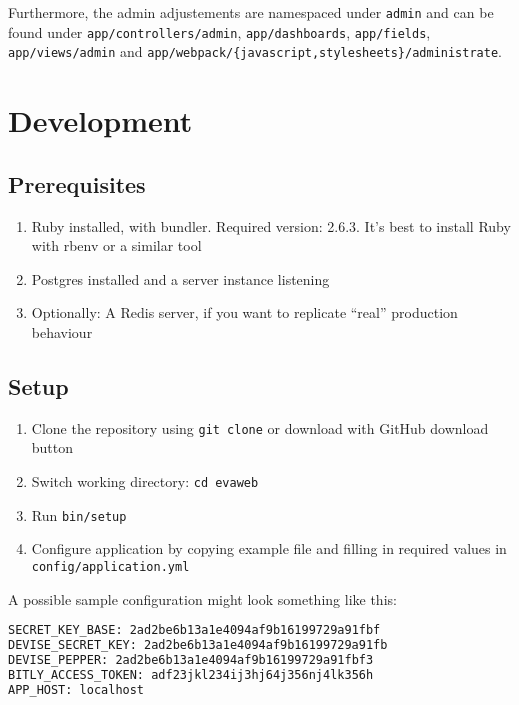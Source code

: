 \documentclass[11pt]{article}
\begin{document}
Furthermore, the admin adjustements are namespaced under \verb|admin|
and can be found under \verb|app/controllers/admin|, \verb|app/dashboards|, \verb|app/fields|, \verb|app/views/admin|
and \verb|app/webpack/{javascript,stylesheets}/administrate|.

\pagebreak
{}
\section{Development}
\subsection{Prerequisites}
\begin{enumerate}
	\item Ruby installed, with bundler. Required version: 2.6.3. It's best to install Ruby with rbenv or a similar tool
	\item Postgres installed and a server instance listening
	\item Optionally: A Redis server, if you want to replicate ``real'' production behaviour
\end{enumerate}

\subsection{Setup}
\begin{enumerate}
	\item Clone the repository using \verb|git clone| or download with GitHub download button
	\item Switch working directory: \verb|cd evaweb|
	\item Run \verb|bin/setup|
	\item Configure application by copying example file and filling in required values in \verb|config/application.yml|
\end{enumerate}

A possible sample configuration might look something like this:

\begin{lstlisting}[language=bash, caption={application.yml}]
SECRET_KEY_BASE: 2ad2be6b13a1e4094af9b16199729a91fbf
DEVISE_SECRET_KEY: 2ad2be6b13a1e4094af9b16199729a91fb
DEVISE_PEPPER: 2ad2be6b13a1e4094af9b16199729a91fbf3
BITLY_ACCESS_TOKEN: adf23jkl234ij3hj64j356nj4lk356h
APP_HOST: localhost
\end{lstlisting}
\end{document}
